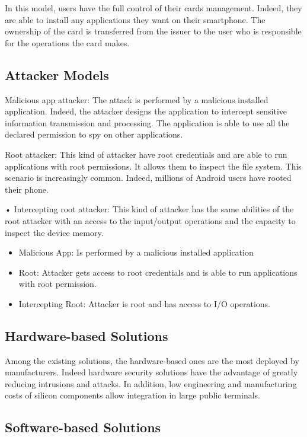 \documentclass{article}
\begin{document}
In this model, users have the full control of their cards
management. Indeed, they are able to install any applications they
want on their smartphone. The ownership of the card is transferred
from the issuer to the user who is responsible for the operations the
card makes.

\subsection{Attacker Models}

Malicious app attacker: The attack is performed by a
malicious installed application. Indeed, the attacker designs
the application to intercept sensitive information transmission
and processing. The application is able to use all the declared
permission to spy on other applications.

Root attacker: This kind of attacker have root credentials and
are able to run applications with root permissions. It allows
them to inspect the file system. This scenario is increasingly
common. Indeed, millions of Android users have rooted their
phone.

• Intercepting root attacker: This kind of attacker has the same
abilities of the root attacker with an access to the input/output
operations and the capacity to inspect the device memory.

\begin{itemize}
\item Malicious App: Is performed by a malicious installed application
\item Root: Attacker gets access to root credentials and is able to run applications with root permission.
\item Intercepting Root: Attacker is root and has access to I/O operations.
\end{itemize}

\subsection{Hardware-based Solutions}

Among the existing solutions, the hardware-based ones are the most deployed by manufacturers. Indeed hardware security solutions have the advantage of greatly reducing intrusions and attacks. In addition, low engineering and manufacturing costs of silicon components allow integration in large public terminals. 

\subsection{Software-based Solutions}
\end{document}
